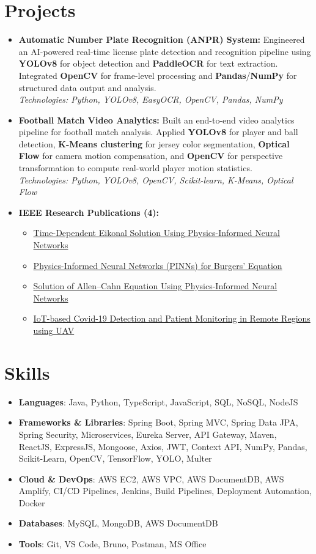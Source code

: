 \documentclass[letterpaper,10.8pt]{article}
\newcommand{\resumeItem}[2]{
  \item\small{
    \textbf{#1}{: #2 \vspace{-2pt}}
  }
}
\newcommand{\resumeSubItem}[2]{\resumeItem{#1}{#2}\vspace{-4pt}}
\newcommand{\resumeSubHeadingListStart}{\begin{itemize}[leftmargin=*]}
\newcommand{\resumeSubHeadingListEnd}{\end{itemize}}
\begin{document}
\section{Projects}
\begin{itemize}[leftmargin=*]
    \item \textbf{Automatic Number Plate Recognition (ANPR) System:}
    Engineered an AI-powered real-time license plate detection and recognition pipeline using \textbf{YOLOv8} for object detection and \textbf{PaddleOCR} for text extraction. Integrated \textbf{OpenCV} for frame-level processing and \textbf{Pandas}/\textbf{NumPy} for structured data output and analysis.\\
    \textit{Technologies: Python, YOLOv8, EasyOCR, OpenCV, Pandas, NumPy}

    \item \textbf{Football Match Video Analytics:}
    Built an end-to-end video analytics pipeline for football match analysis. Applied \textbf{YOLOv8} for player and ball detection, \textbf{K-Means clustering} for jersey color segmentation, \textbf{Optical Flow} for camera motion compensation, and \textbf{OpenCV} for perspective transformation to compute real-world player motion statistics.\\
    \textit{Technologies: Python, YOLOv8, OpenCV, Scikit-learn, K-Means, Optical Flow}

    \item \textbf{IEEE Research Publications (4):}
    \begin{itemize}
        \item \href{https://ieeexplore.ieee.org/document/10870849}{Time-Dependent Eikonal Solution Using Physics-Informed Neural Networks}
        \item \href{https://ieeexplore.ieee.org/document/10870712}{Physics-Informed Neural Networks (PINNs) for Burgers' Equation}
        \item \href{https://ieeexplore.ieee.org/document/10870453}{Solution of Allen--Cahn Equation Using Physics-Informed Neural Networks}
        \item \href{https://ieeexplore.ieee.org/document/10963054}{IoT-based Covid-19 Detection and Patient Monitoring in Remote Regions using UAV}
    \end{itemize}
\end{itemize}

\section{Skills}
\resumeSubHeadingListStart
\resumeSubItem{Languages}{Java, Python, TypeScript, JavaScript, SQL, NoSQL, NodeJS}
\resumeSubItem{Frameworks \& Libraries}{Spring Boot, Spring MVC, Spring Data JPA, Spring Security, Microservices, Eureka Server, API Gateway, Maven, ReactJS, ExpressJS, Mongoose, Axios, JWT, Context API, NumPy, Pandas, Scikit-Learn, OpenCV, TensorFlow, YOLO, Multer}
\resumeSubItem{Cloud \& DevOps}{AWS EC2, AWS VPC, AWS DocumentDB, AWS Amplify, CI/CD Pipelines, Jenkins, Build Pipelines, Deployment Automation, Docker}
\resumeSubItem{Databases}{MySQL, MongoDB, AWS DocumentDB}
\resumeSubItem{Tools}{Git, VS Code, Bruno, Postman, MS Office}
\resumeSubHeadingListEnd
\end{document}
